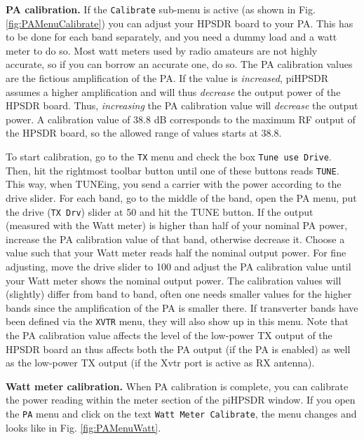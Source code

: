 \documentclass[12pt]{book}
\def\rett#1{\texttt{\color{red}#1}}
\def\bltt#1{\texttt{\color{blue}#1}}
\begin{document}
\textbf{PA calibration.} If the \rett{Calibrate} sub-menu is active
(as shown in Fig. \ref{fig:PAMenuCalibrate}) you can adjust your
HPSDR board to your PA. This has to be done for each band separately,
and you need a dummy load and a watt meter to do so. Most watt meters
used by radio amateurs are not highly accurate, so if you can borrow
an accurate one, do so. The PA calibration values are the fictious
amplification of the PA. If the value is \textit{increased}, 
piHPSDR assumes a higher amplification and will thus \textit{decrease}
the output power of the HPSDR board. Thus, \textit{increasing} the
PA calibration value will \textit{decrease} the output power. A calibration
value of 38.8 dB corresponds to the maximum RF output of the HPSDR board,
so the allowed range of values starts at 38.8.

To start calibration, go to the \bltt{TX} menu and check the
box \rett{Tune use Drive}. Then, hit the rightmost toolbar button
until one of these buttons reads \bltt{TUNE}. This way, when
TUNEing, you send a carrier with the power according to the drive
slider. For each band, go to the middle of the band, open the PA
menu, put the drive (\rett{TX Drv}) slider at 50 and hit the TUNE button. If the
output (measured with the Watt meter) is higher than half
 of your nominal PA power, increase the
PA calibration value of that band, otherwise decrease it. Choose
a value such that your Watt meter reads half the nominal output
power. For fine adjusting, move the drive slider to 100 and
adjust the PA calibration value until your Watt meter shows the
nominal output  power. The calibration values will  (slightly)
differ from band to band, often one needs smaller values for the
higher bands since the amplification of the PA is smaller there.
If transverter bands have been defined via the \bltt{XVTR} menu,
they will also show up in this menu. Note that the PA calibration
value affects the level of the low-power TX output of the HPSDR board
an thus affects both the PA output (if the PA is enabled) as well
as the low-power TX output (if the Xvtr port is active as RX antenna).

\textbf{Watt meter calibration.} When PA calibration is complete,
you can calibrate the power reading within the meter section of
the piHPSDR window. If you open the \bltt{PA} menu and click
on the text \rett{Watt Meter Calibrate}, the menu changes
and looks like in Fig. \ref{fig:PAMenuWatt}.
\end{document}
